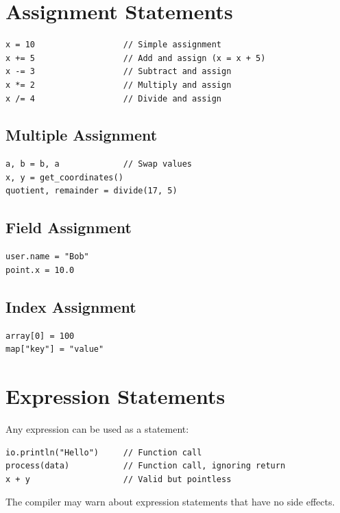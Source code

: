 \section{Assignment Statements}

\begin{lstlisting}
x = 10                  // Simple assignment
x += 5                  // Add and assign (x = x + 5)
x -= 3                  // Subtract and assign
x *= 2                  // Multiply and assign
x /= 4                  // Divide and assign
\end{lstlisting}

\subsection{Multiple Assignment}

\begin{lstlisting}
a, b = b, a             // Swap values
x, y = get_coordinates()
quotient, remainder = divide(17, 5)
\end{lstlisting}

\subsection{Field Assignment}

\begin{lstlisting}
user.name = "Bob"
point.x = 10.0
\end{lstlisting}

\subsection{Index Assignment}

\begin{lstlisting}
array[0] = 100
map["key"] = "value"
\end{lstlisting}

\section{Expression Statements}

Any expression can be used as a statement:

\begin{lstlisting}
io.println("Hello")     // Function call
process(data)           // Function call, ignoring return
x + y                   // Valid but pointless
\end{lstlisting}

\begin{note}
The compiler may warn about expression statements that have no side effects.
\end{note}

